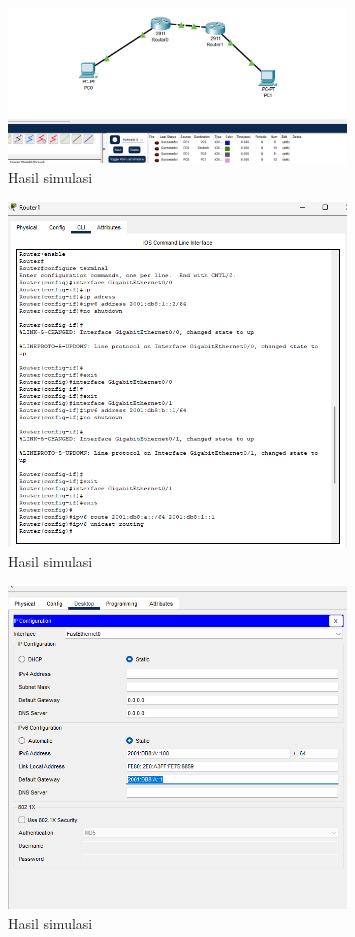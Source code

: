 \begin{figure}
    \centering
    \includegraphics[width=0.8\textwidth]{P1/img/tumodsimulasi1.png}
    \caption{Hasil simulasi}
    \label{fig:hasil_simulasi_ipv6}
\end{figure}

\begin{figure}
    \centering
    \includegraphics[width=0.8\textwidth]{P1/img/tumodsimulasi2.png}
    \caption{Hasil simulasi}
    \label{fig:hasil_routing_dinamis_ipv6}
\end{figure}

\begin{figure}
    \centering
    \includegraphics[width=0.8\textwidth]{P1/img/tumodsimulasi3.png}
    \caption{Hasil simulasi}
    \label{fig:hasil_uji_dinamis_ipv6}

\end{figure}

